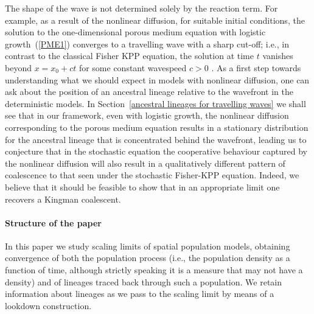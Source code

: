 \documentclass[EJP]{ejpecp} %
\newcommand{\citep}[1]{\cite{#1}}
\begin{document}
The shape of the wave is not determined solely by the reaction term.
For example, as a result of the nonlinear diffusion, 
for suitable initial conditions, the solution to the one-dimensional 
porous medium equation with logistic growth~(\ref{PME1}) converges to a travelling
wave with a sharp cut-off; i.e., in contrast to the classical 
Fisher KPP equation, the solution at time $t$
vanishes beyond $x=x_0+ct$ for some constant wavespeed $c>0$ \citep{kamin/rosenau:2004}.
As a first step towards understanding what we should expect in models with
nonlinear diffusion, one can ask about the position of an ancestral lineage
relative to the wavefront in the deterministic models. In 
Section~\ref{ancestral lineages for travelling waves}
we shall see that in our framework, even with logistic growth, the nonlinear diffusion 
corresponding to the porous medium equation results
in a stationary distribution for the ancestral lineage
that is concentrated behind the wavefront, leading 
us to conjecture that in the stochastic equation
the cooperative behaviour captured by the nonlinear diffusion will also 
result in a qualitatively different pattern of coalescence to that seen under the 
stochastic Fisher-KPP equation. Indeed, we believe that it should be feasible to 
show that in an appropriate limit one recovers a Kingman coalescent.

\paragraph{Structure of the paper}

In this paper we study scaling limits of spatial population models,
obtaining convergence of both the population process
(i.e., the population density as a function of time,
although strictly speaking it is a measure that may not have a density)
and of lineages traced back through such a population.
We retain information about lineages as we pass to the scaling limit
by means of a lookdown construction.
\end{document}
